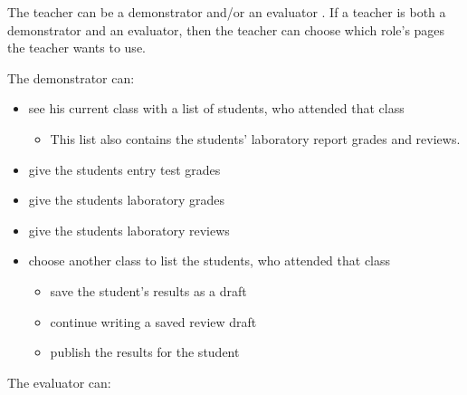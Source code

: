 The teacher can be a demonstrator and/or an evaluator . If a teacher is both a demonstrator and an evaluator, then the teacher can choose which role's pages the teacher wants to use.


The demonstrator can:

\begin{itemize}
	\item see his current class with a list of students, who attended that class
	\begin{itemize}
		\item This list also contains the students' laboratory report grades and reviews.
	\end{itemize}
	\item give the students entry test grades
	\item give the students laboratory grades
	\item give the students laboratory reviews
	\item choose another class to list the students, who attended that class
	\begin{itemize}
		\item save the student's results as a draft
		\item continue writing a saved review draft
		\item publish the results for the student
	\end{itemize}
\end{itemize}


The evaluator can:

